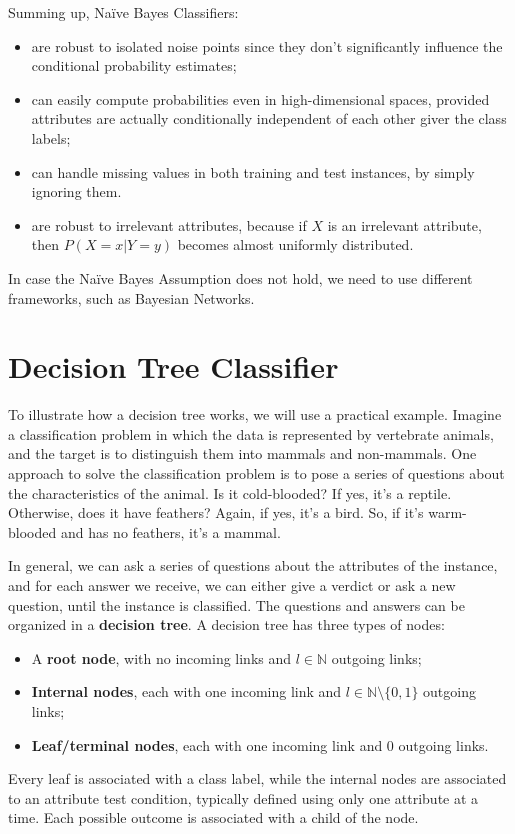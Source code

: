 Summing up, Naïve Bayes Classifiers:
\begin{itemize}
    \item are robust to isolated noise points since they don't significantly influence the conditional probability estimates;
    \item can easily compute probabilities even in high-dimensional spaces, provided attributes are actually conditionally independent of each other giver the class labels;
    \item can handle missing values in both training and test instances, by simply ignoring them.
    \item are robust to irrelevant attributes, because if $X$ is an irrelevant attribute, then $P(X=x|Y=y)$ becomes almost uniformly distributed.
\end{itemize}
In case the Naïve Bayes Assumption does not hold, we need to use different frameworks, such as Bayesian Networks.

\section{Decision Tree Classifier}

To illustrate how a decision tree works, we will use a practical example. Imagine a classification problem in which the data is represented by vertebrate animals, and the target is to distinguish them into mammals and non-mammals. One approach to solve the classification problem is to pose a series of questions about the characteristics of the animal. Is it cold-blooded? If yes, it's a reptile. Otherwise, does it have feathers? Again, if yes, it's a bird. So, if it's warm-blooded and has no feathers, it's a mammal.

In general, we can ask a series of questions about the attributes of the instance, and for each answer we receive, we can either give a verdict or ask a new question, until the instance is classified. The questions and answers can be organized in a \textbf{decision tree}. A decision tree has three types of nodes:
\begin{itemize}
    \item A \textbf{root node}, with no incoming links and $l \in \mathbb{N}$ outgoing links;
    \item \textbf{Internal nodes}, each with one incoming link and $l \in \mathbb{N} \setminus \{0,1\}$ outgoing links;
    \item \textbf{Leaf/terminal nodes}, each with one incoming link and 0 outgoing links.
\end{itemize}
Every leaf is associated with a class label, while the internal nodes are associated to an attribute test condition, typically defined using only one attribute at a time. Each possible outcome is associated with a child of the node.

